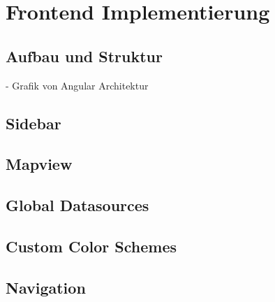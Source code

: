 \section{Frontend Implementierung}

\subsection{Aufbau und Struktur}
- Grafik von Angular Architektur
\subsection{Sidebar}
\subsection{Mapview}
\subsection{Global Datasources}
\subsection{Custom Color Schemes}
\subsection{Navigation}